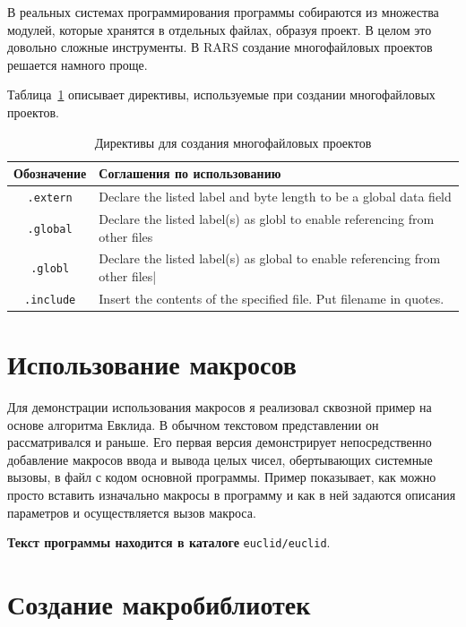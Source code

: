 В реальных системах программирования программы собираются из множества модулей, которые хранятся в отдельных файлах, образуя проект. В целом это довольно сложные инструменты. В RARS создание многофайловых проектов решается намного проще.

Таблица~\ref{table-global-direct} описывает директивы, используемые при создании многофайловых проектов.

\begin{table}[h]
    \caption{Директивы для создания многофайловых проектов}
    \centering
    \begin{tabularx}{\textwidth}{|c|X|}
        \hline
        \textbf{Обозначение} & \textbf{Соглашения по использованию} \\
        \hline %
        \verb|.extern| & Declare the listed label and byte length to be a global data field \\
        \hline
        \verb|.global| & Declare the listed label(s) as globl to enable referencing from other files \\
        \hline
        \verb|.globl| & Declare the listed label(s) as global to enable referencing from other files| \\
        \hline
        \verb|.include| & Insert the contents of the specified file.  Put filename in quotes. \\
        \hline
    \end{tabularx}
    \label{table-global-direct}
\end{table}

\section{Использование макросов}

Для демонстрации использования макросов я реализовал сквозной пример на основе алгоритма Евклида. В обычном текстовом представлении он рассматривался и раньше. Его первая версия демонстрирует непосредственно добавление макросов ввода и вывода целых чисел, обертывающих системные вызовы, в файл с кодом основной программы. Пример показывает, как можно просто вставить изначально макросы в программу и как в ней задаются описания параметров и осуществляется вызов макроса.

\textbf{Текст программы находится в каталоге} \verb|euclid/euclid|.

\section{Создание макробиблиотек}

